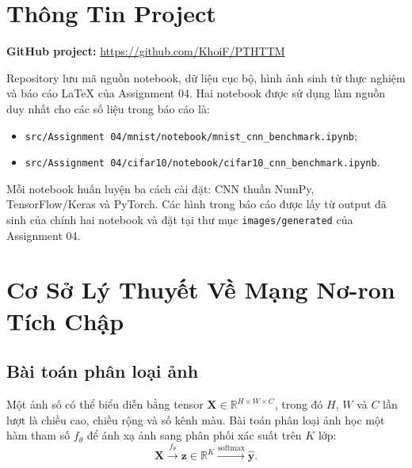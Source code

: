 \documentclass[12pt,a4paper]{report}
\newcommand{\modelpath}[1]{\texttt{#1}}
\begin{document}
\tableofcontents
\newpage
\listoffigures
\newpage
\listoftables
\newpage
{}

\chapter*{Thông Tin Project}

\noindent\textbf{GitHub project:} \url{https://github.com/KhoiF/PTHTTM}

\vspace{0.4cm}
\noindent
Repository lưu mã nguồn notebook, dữ liệu cục bộ, hình ảnh sinh từ thực nghiệm và báo cáo \LaTeX{} của Assignment 04.
Hai notebook được sử dụng làm nguồn duy nhất cho các số liệu trong báo cáo là:
\begin{itemize}
    \item \modelpath{src/Assignment 04/mnist/notebook/mnist\_cnn\_benchmark.ipynb};
    \item \modelpath{src/Assignment 04/cifar10/notebook/cifar10\_cnn\_benchmark.ipynb}.
\end{itemize}

\noindent
Mỗi notebook huấn luyện ba cách cài đặt: CNN thuần NumPy, TensorFlow/Keras và PyTorch.
Các hình trong báo cáo được lấy từ output đã sinh của chính hai notebook và đặt tại
thư mục \modelpath{images/generated} của Assignment 04.
\newpage

\chapter{Cơ Sở Lý Thuyết Về Mạng Nơ-ron Tích Chập}

\section{Bài toán phân loại ảnh}
Một ảnh số có thể biểu diễn bằng tensor
$\mathbf{X}\in\mathbb{R}^{H\times W\times C}$,
trong đó $H$, $W$ và $C$ lần lượt là chiều cao, chiều rộng và số kênh màu.
Bài toán phân loại ảnh học một hàm tham số $f_{\theta}$ để ánh xạ ảnh sang phân phối xác suất trên $K$ lớp:
\begin{equation}
    \mathbf{X}
    \xrightarrow{f_{\theta}}
    \mathbf{z}\in\mathbb{R}^{K}
    \xrightarrow{\text{softmax}}
    \hat{\mathbf{y}}.
\end{equation}
\end{document}
